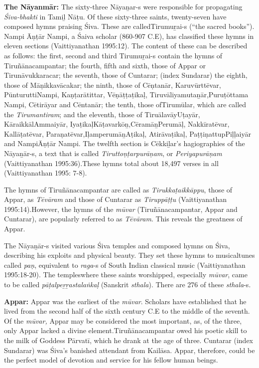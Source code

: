 \textbf{The Nāyanmār:} The sixty-three Nāyaṉar-s were responsible for propagating \textit{Śiva-bhakti} in Tamiḻ Nāṭu. Of these sixty-three saints, twenty-seven have composed hymns praising Śiva. These are called\break Tirumuṟai-s (“the sacred books”). Nampi Āṇṭār Nampi, a Śaiva scholar (860-907 C.E), has classified these hymns in eleven sections (Vaittiya\-nathan 1995:12). The content of these can be described as follows: the first, second and third Tirumuṟai-s contain the hymns of Tiruñānacampantar; the fourth, fifth and sixth, those of Appar or Tirunāvu\-kkaracar; the seventh, those of Cuntarar; (index Sundarar) the eighth, those of Māṇikkavācakar; the ninth, those of Cēṇtanār, Karuvūrttēvar, PūnturuttiNampi, Kaṇṭarātittar, Vēṇāṭṭaṭikaḷ, Tiruvāliyamutaṉār,\break Puruṭōttama Nampi, Cētirāyar and Cēntanār; the tenth, those of\break Tirumūlar, which are called the \textit{Tirumantiram}; and the eleventh, those of TiruālavāyUṭayār, KāraikkālAmmaiyār, IyaṭikaḷKāṭavarkōṉ,\break CēramāṉPerumāḷ, Nakkīratēvar, Kallāṭatēvar, Paraṇatēvar,\break IḷamperumāṉAṭikaḷ, Atirāvaṭikaḷ, PaṭṭiṇattupPiḷḷaiyār and Nampi\break Āṇṭār Nampi. The twelfth section is Cēkkiḻar’s hagiographies of the Nāyaṉār-s, a text that is called \textit{Tiruttoṇṭarpurāṇam}, or \textit{Periyapurāṇam} (Vaittiyanathan 1995:36).These hymns total about 18,497 verses in all (Vaittiyanathan 1995: 7-8).

The hymns of Tiruñānacampantar are called as \textit{Tirukkaṭaikkāppu}, those of Appar, as \textit{Tēvāram} and those of Cuntarar as \textit{Tiruppāṭṭu }(Vaittiya\-nathan 1995:14).However, the hymns of the \textit{mūvar} (Tiruñānacampantar, Appar and Cuntarar), are popularly referred to as \textit{Tēvāram}. This reveals the greatness of Appar.

The Nāyaṉār-s visited various Śiva temples and composed hymns on Śiva, describing his exploits and physical beauty. They set these hymns to musicaltunes called \textit{paṇ}, equivalent to \textit{raga}-s of South Indian classical music (Vaittiyanathan 1995:18-20). The templeswhere these saints worshipped, especially \textit{mūvar}, came to be called \textit{pāṭalpeṟṟastalaṅkaḷ} (Sanskrit \textit{sthala}). There are 276 of these \textit{sthala}-s.

\textbf{Appar:} Appar was the earliest of the \textit{mūvar}. Scholars have established that he lived from the second half of the sixth century C.E to the middle of the seventh. Of the \textit{mūvar, }Appar may be considered the most important, as, of the three, only Appar lacked a divine element.Tiruñānacampantar owed his poetic skill to the milk of Goddess Pārvatī, which he drank at the age of three. Cuntarar (index Sundarar) was Śiva’s banished attendant from Kailāsa. Appar, therefore, could be the perfect model of devotion and service for his fellow human beings.


